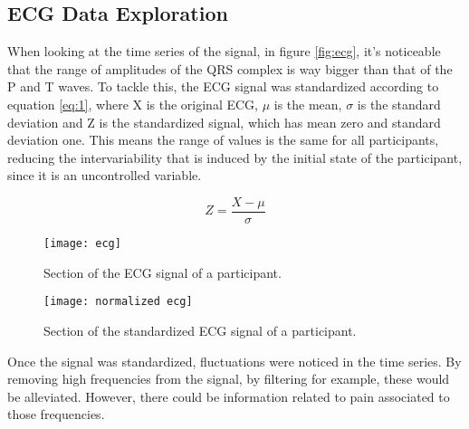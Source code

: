 

\subsection{ECG Data Exploration}
When looking at the time series of the signal, in figure \ref{fig:ecg}, it's noticeable that the range of amplitudes of the QRS complex is way bigger than that of the P and T waves.
To tackle this, the ECG signal was standardized according to equation \ref{eq:1}, where X is the original ECG, $\mu$ is the mean, $\sigma$ is the standard deviation and Z is the standardized signal, which has mean zero and standard deviation one. 
This means the range of values is the same for all participants, reducing the intervariability that is induced by the initial state of the participant, since it is an uncontrolled variable.

\begin{equation} \label{eq:1}
Z = \frac{X-\mu}{\sigma}
\end{equation}


\begin{figure}[htbp]
    \centering
    \begin{minipage}{0.45\textwidth}
        \centering
        \texttt{[image: ecg]}
        \caption{Section of the ECG signal of a participant.}
        \label{fig:ecg}
    \end{minipage}
    \hfill
    \begin{minipage}{0.45\textwidth}
        \centering
        \texttt{[image: normalized ecg]}
        \caption{Section of the standardized ECG signal of a participant.}
        \label{fig:normalized_ecg}
    \end{minipage}
\end{figure}

Once the signal was standardized, fluctuations were noticed in the time series.
By removing high frequencies from the signal, by filtering for example, these would be alleviated.
However, there could be information related to pain associated to those frequencies.

